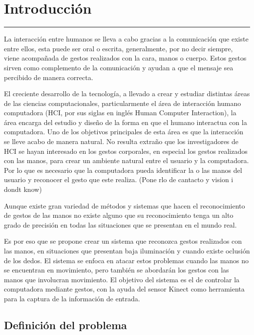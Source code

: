 \chapter{Introducci\'on}\label{capit:cap1}
\vspace{-2.0325ex}%
\noindent
\rule{\textwidth}{0.5pt}
\vspace{-5.5ex}%
\newcommand{\pushline}{\Indp}%

La interacción entre humanos se lleva a cabo gracias a la comunicación  que existe entre ellos, esta puede ser oral o escrita, generalmente, por no decir siempre, viene acompañada de gestos realizados con la cara, manos o cuerpo. 
Estos gestos sirven como complemento de la comunicación y ayudan a que el mensaje sea percibido de manera correcta.


El creciente desarrollo de la tecnología, a llevado  a crear y estudiar distintas áreas de las ciencias computacionales, particularmente el área de interacción humano computadora (HCI, por sus siglas en ingl\'es Human Computer Interaction), la área encarga del estudio y diseño de la forma en que el humano interactua con la computadora. 
Uno de los objetivos principales de esta área es que la interacción se lleve acabo de manera natural. 
No resulta extraño que los investigadores de HCI se hayan interesado en los gestos corporales, en especial los gestos realizados con las manos, para crear un ambiente natural entre el usuario y la computadora.  
Por lo que es necesario que la computadora pueda identificar la o las manos del usuario y reconocer el gesto que este realiza. 
(Pone rlo de cantacto y vision i dondt know)

Aunque existe gran variedad de métodos y sistemas que hacen el reconocimiento de gestos de las manos no existe alguno que su reconocimiento tenga un alto grado de precisión en todas las situaciones que se presentan en el mundo real.  

Es por eso que se propone crear un sistema que reconozca gestos realizados con las manos, en situaciones que presentan baja iluminación y cuando existe oclusión de los dedos. 
El sistema se enfoca en atacar estos problemas cuando las manos no se encuentran en movimiento, pero también se abordar\'an los gestos con las manos que involucran movimiento. El objetivo del sistema es el de controlar la computadora mediante gestos, con la ayuda del sensor Kinect como herramienta para la captura de la información de entrada. 
  

\section{Definici\'on del problema}\label{sec:DefinicionProblema}

